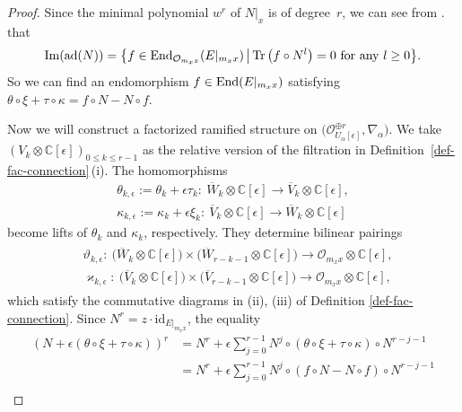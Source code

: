 \documentclass[pdftex]{sigma}
\numberwithin{equation}{section}
\newcommand\im{\mathop{\rm Im}\nolimits}
\newcommand{\Tr}{\mathop{\rm Tr}\nolimits}
\newcommand\End{\mathop{\rm End}\nolimits}
\begin{document}
\begin{proof}
Since the minimal polynomial $w^r$ of $N|_x$ is of degree~$r$, we can see
from \cite[Lemma~1.4]{Inaba-3}. that
\begin{equation*}
 \im ( \mathrm{ad}(N) )
 =
\big\{ f\in\End_{{\mathcal O}_{m_xx}}(E|_{m_xx}) \, \big| \,
 \text{$\Tr\big(f\circ N^l\big)=0$ for any $l\geq 0$} \big\}.
\end{equation*}
So we can find an endomorphism
$f\in\End(E|_{m_xx})$ satisfying
$\theta\circ\xi+\tau\circ\kappa=f\circ N-N\circ f$.

Now we will construct a factorized ramified structure
on $\big({\mathcal O}_{U_{\alpha}[\epsilon]}^{\oplus r} , \nabla_{\alpha}\big)$.
We take $(V_k\otimes\mathbb{C}[\epsilon])_{0\leq k\leq r-1}$
as the relative version of the filtration in Definition~\ref{def-fac-connection}\,(i).
The homomorphisms
\begin{gather*}
 \theta_{k,\epsilon}
 :=
 \theta_k+\epsilon\tau_k
 \colon \
 \overline{W}_k\otimes\mathbb{C}[\epsilon]
 \longrightarrow \overline{V}_k\otimes\mathbb{C}[\epsilon],
 \\
 \kappa_{k,\epsilon}
:=
 \kappa_k+\epsilon\xi_k
 \colon \
 \overline{V}_k\otimes\mathbb{C}[\epsilon]
 \longrightarrow \overline{W}_k\otimes\mathbb{C}[\epsilon]
\end{gather*}
become lifts of $\theta_k$ and $\kappa_k$, respectively.
They determine bilinear pairings
\begin{gather*}
\begin{split}
& \vartheta_{k,\epsilon}
 \colon \
 \big(\overline{W}_k\otimes\mathbb{C}[\epsilon]\big)
 \times \big(\overline{W}_{r-k-1}\otimes\mathbb{C}[\epsilon] \big)
 \longrightarrow {\mathcal O}_{m_xx}\otimes\mathbb{C}[\epsilon],
 \\
& \varkappa_{k,\epsilon}
 \colon \
 \big( \overline{V}_k\otimes\mathbb{C}[\epsilon] \big)
 \times \big( \overline{V}_{r-k-1}\otimes\mathbb{C}[\epsilon] \big)
 \longrightarrow {\mathcal O}_{m_xx}\otimes\mathbb{C}[\epsilon],
 \end{split}
\end{gather*}
which satisfy the commutative diagrams in (ii), (iii)
of Definition \ref{def-fac-connection}.
Since $N^r=z\cdot\mathrm{id}_{E|_{m_xx}}$, the equality
\begin{align*}
 (N+\epsilon (\theta\circ\xi+\tau\circ\kappa))^r
 &=
 N^r+\epsilon\sum_{j=0}^{r-1} N^j\circ (\theta\circ\xi+\tau\circ\kappa)\circ N^{r-j-1}
 \\
 &=
 N^r+\epsilon\sum_{j=0}^{r-1} N^j\circ (f\circ N-N\circ f) \circ N^{r-j-1}
 \\

\end{align*}
\end{proof}
\end{document}
